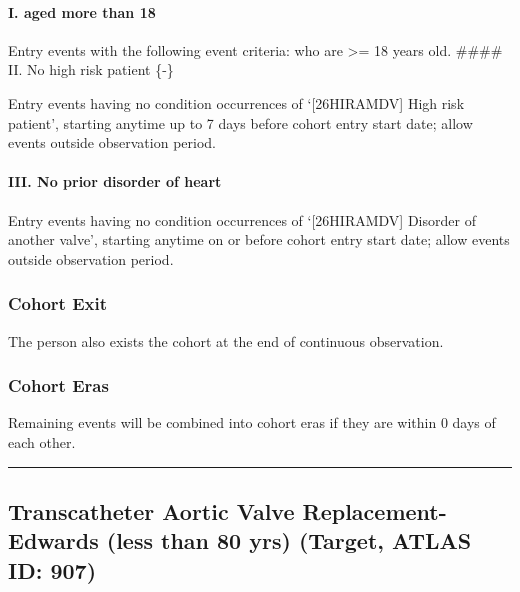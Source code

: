 \documentclass[
  12pt,
]{article}
\begin{document}
\paragraph*{I. aged more than 18}\label{i.-aged-more-than-18-4}

Entry events with the following event criteria: who are \textgreater= 18
years old. \#\#\#\# II. No high risk patient \{-\}

Entry events having no condition occurrences of `{[}26HIRAMDV{]} High
risk patient', starting anytime up to 7 days before cohort entry start
date; allow events outside observation period.

\paragraph*{III. No prior disorder of
heart}\label{iii.-no-prior-disorder-of-heart-4}

Entry events having no condition occurrences of `{[}26HIRAMDV{]}
Disorder of another valve', starting anytime on or before cohort entry
start date; allow events outside observation period.

\subsubsection{Cohort Exit}\label{cohort-exit-6}

The person also exists the cohort at the end of continuous observation.

\subsubsection{Cohort Eras}\label{cohort-eras-6}

Remaining events will be combined into cohort eras if they are within 0
days of each other.

\begin{center}\rule{0.5\linewidth}{0.5pt}\end{center}

\subsection{Transcatheter Aortic Valve Replacement-Edwards (less than 80
yrs) (Target, ATLAS ID:
907)}\label{transcatheter-aortic-valve-replacement-edwards-less-than-80-yrs-target-atlas-id-907}
\end{document}
